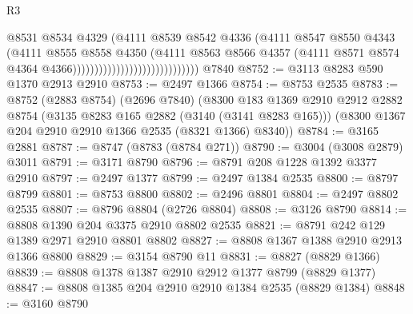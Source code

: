 \begin{lexlean}{R3}
\begin{coremodule}
                                                    @8531
                                                    @8534
                                                    @4329
                                                    (@4111
                                                      @8539
                                                      @8542
                                                      @4336
                                                      (@4111
                                                        @8547
                                                        @8550
                                                        @4343
                                                        (@4111
                                                          @8555
                                                          @8558
                                                          @4350
                                                          (@4111
                                                            @8563
                                                            @8566
                                                            @4357
                                                            (@4111
                                                              @8571
                                                              @8574
                                                              @4364
                                                              @4366)))))))))))))))))))))))))))))
    @7840
@8752 := @3113 @8283 @590 @1370 @2913 @2910
@8753 := @2497 @1366
@8754 := @8753 @2535
@8783 := @8752
    (@2883 @8754)
    (@2696 @7840)
    (@8300
      @183
      @1369
      @2910
      @2912
      @2882
      @8754
      (@3135 @8283 @165 @2882 (@3140 (@3141 @8283 @165)))
      (@8300 @1367 @204 @2910 @2910 @1366 @2535 (@8321 @1366) @8340))
@8784 := @3165 @2881
@8787 := @8747 (@8783 (@8784 @271))
@8790 := @3004 (@3008 @2879) @3011
@8791 := @3171 @8790
@8796 := @8791 @208 @1228 @1392 @3377 @2910
@8797 := @2497 @1377
@8799 := @2497 @1384 @2535
@8800 := @8797 @8799
@8801 := @8753 @8800
@8802 := @2496 @8801
@8804 := @2497 @8802 @2535
@8807 := @8796 @8804 (@2726 @8804)
@8808 := @3126 @8790
@8814 := @8808 @1390 @204 @3375 @2910 @8802 @2535
@8821 := @8791 @242 @129 @1389 @2971 @2910 @8801 @8802
@8827 := @8808 @1367 @1388 @2910 @2913 @1366 @8800
@8829 := @3154 @8790 @11
@8831 := @8827 (@8829 @1366)
@8839 := @8808 @1378 @1387 @2910 @2912 @1377 @8799 (@8829 @1377)
@8847 := @8808 @1385 @204 @2910 @2910 @1384 @2535 (@8829 @1384)
@8848 := @3160 @8790

\end{coremodule}
\end{lexlean}
